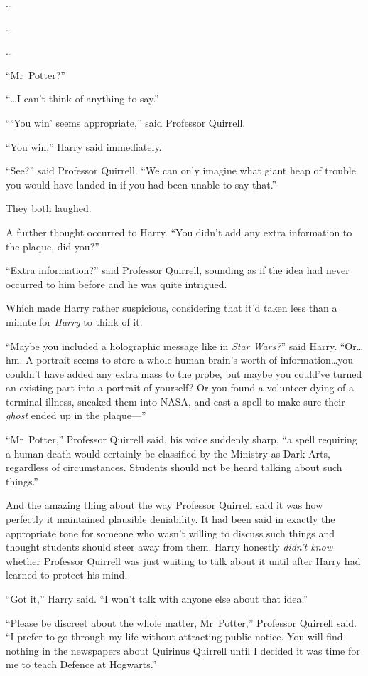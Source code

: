 …

…

…

“Mr~Potter?”

“…I can’t think of anything to say.”

“{}‘You win’ seems appropriate,” said Professor Quirrell.

“You win,” Harry said immediately.

“See?” said Professor Quirrell.
“We can only imagine what giant heap of trouble you would have landed in if you had been unable to say that.”

They both laughed.

A further thought occurred to Harry.
“You didn’t add any extra information to the plaque, did you?”

“Extra information?” said Professor Quirrell, sounding as if the idea had never occurred to him before and he was quite intrigued.

Which made Harry rather suspicious, considering that it’d taken less than a minute for \emph{Harry} to think of it.

“Maybe you included a holographic message like in \emph{Star Wars?}” said Harry.
“Or…hm. A portrait seems to store a whole human brain’s worth of information…you couldn’t have added any extra mass to the probe, but maybe you could’ve turned an existing part into a portrait of yourself? Or you found a volunteer dying of a terminal illness, sneaked them into NASA, and cast a spell to make sure their \emph{ghost} ended up in the plaque—”

“Mr~Potter,” Professor Quirrell said, his voice suddenly sharp, “a spell requiring a human death would certainly be classified by the Ministry as Dark Arts, regardless of circumstances. Students should not be heard talking about such things.”

And the amazing thing about the way Professor Quirrell said it was how perfectly it maintained plausible deniability. It had been said in exactly the appropriate tone for someone who wasn’t willing to discuss such things and thought students should steer away from them. Harry honestly \emph{didn’t know} whether Professor Quirrell was just waiting to talk about it until after Harry had learned to protect his mind.

“Got it,” Harry said.
“I won’t talk with anyone else about that idea.”

“Please be discreet about the whole matter, Mr~Potter,” Professor Quirrell said.
“I prefer to go through my life without attracting public notice. You will find nothing in the newspapers about Quirinus Quirrell until I decided it was time for me to teach Defence at Hogwarts.”

